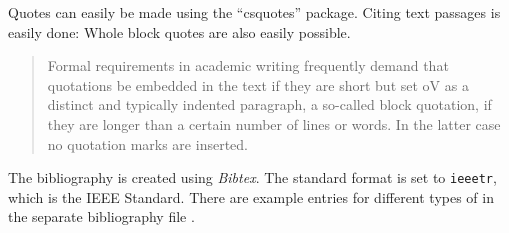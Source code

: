Quotes can easily be made using the \enquote{csquotes} package.
Citing text passages is easily done:  Whole block quotes are also easily 
possible.

\blockquote{Formal requirements in academic writing frequently demand that
quotations be embedded in the text if they are short but set oV as a distinct
and typically indented paragraph, a so-called block quotation, if they are
longer than a certain number of lines or words. In the latter case no quotation
marks are inserted.}

The bibliography is created using \emph{Bibtex}. The
standard format is set to \texttt{ieeetr}, which is the IEEE Standard. There
are example entries for different types of  in the separate bibliography file
\cite{article} \cite{book} \cite{booklet} \cite{conference} \cite{inbook}
\cite{incollection} \cite{manual} \cite{mastersthesis} \cite{misc}
\cite{phdthesis} \cite{proceedings} \cite{techreport} \cite{unpublished}.